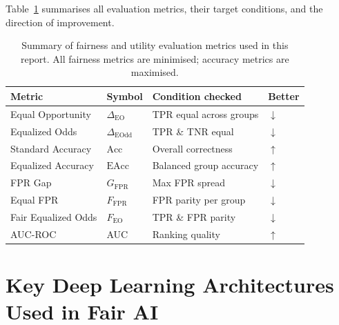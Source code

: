 Table~\ref{tab:metrics_summary} summarises all evaluation metrics,
their target conditions, and the direction of improvement.
\begin{table}[!htbp]
  \centering
  \caption{Summary of fairness and utility evaluation metrics used
           in this report.  All fairness metrics are minimised;
           accuracy metrics are maximised.}
  \label{tab:metrics_summary}
  \small
  \begin{tabular}{llll}
    \toprule
    \textbf{Metric} & \textbf{Symbol} & \textbf{Condition checked}
                    & \textbf{Better} \\
    \midrule
    Equal Opportunity   & $\Delta_{\mathrm{EO}}$     & TPR equal across groups    & $\downarrow$ \\
    Equalized Odds      & $\Delta_{\mathrm{EOdd}}$   & TPR \& TNR equal           & $\downarrow$ \\
    Standard Accuracy   & $\mathrm{Acc}$             & Overall correctness        & $\uparrow$   \\
    Equalized Accuracy  & $\mathrm{EAcc}$            & Balanced group accuracy    & $\uparrow$   \\
    FPR Gap             & $G_{\mathrm{FPR}}$         & Max FPR spread             & $\downarrow$ \\
    Equal FPR           & $F_{\mathrm{FPR}}$         & FPR parity per group       & $\downarrow$ \\
    Fair Equalized Odds & $F_{\mathrm{EO}}$          & TPR \& FPR parity          & $\downarrow$ \\
    AUC-ROC             & AUC                        & Ranking quality            & $\uparrow$   \\
    \bottomrule
  \end{tabular}
\end{table}

\section{Key Deep Learning Architectures Used in Fair AI}
\label{sec:architectures}

